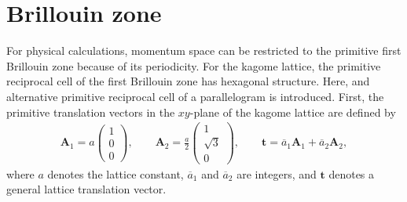 \section{Brillouin zone}
For physical calculations, momentum space can be restricted to the primitive first Brillouin zone because of its periodicity. For the kagome lattice, the primitive reciprocal cell of the first Brillouin zone has hexagonal structure. Here, and alternative primitive reciprocal cell of a parallelogram is introduced.
First, the primitive translation vectors in the $xy$-plane of the kagome lattice are defined by
\begin{align}
    \mathbf{A}_1 = a\begin{pmatrix} 1 \\ 0\\ 0\end{pmatrix}, \qquad \mathbf{A}_2 = \frac{a}{2}\begin{pmatrix} 1 \\ \sqrt{3}\\0    \end{pmatrix}, \qquad \mathbf{t} = \overline{a}_1 \mathbf{A}_1 + \overline{a}_2 \mathbf{A}_2,
\end{align}
where $a$ denotes the lattice constant, $\overline{a}_1$ and $\overline{a}_2$ are integers, and $\mathbf{t}$ denotes a general lattice translation vector.
